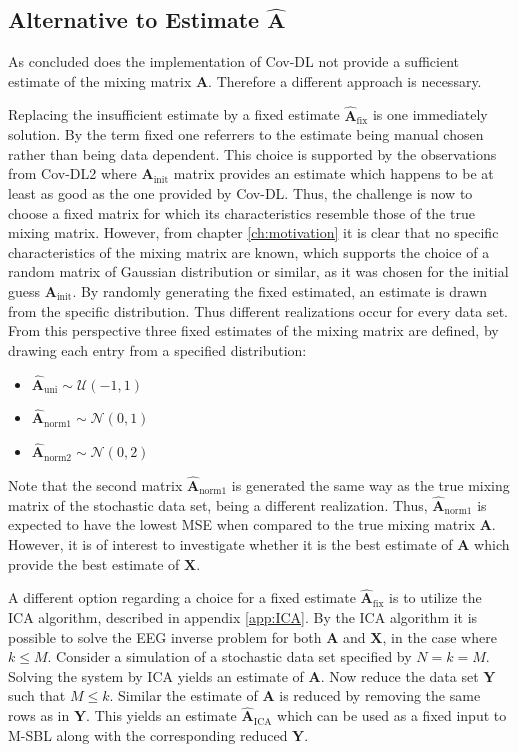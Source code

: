 \subsection{Alternative to Estimate $\hat{\textbf{A}}$}  
As concluded does the implementation of Cov-DL not provide a sufficient estimate of the mixing matrix $\mathbf{A}$. 
Therefore a different approach is necessary. 

Replacing the insufficient estimate by a fixed estimate $\hat{\mathbf{A}}_{\text{fix}}$ is one immediately solution. By the term fixed one referrers to the estimate being manual chosen rather than being data dependent.  
This choice is supported by the observations from Cov-DL2 where $\mathbf{A}_{\text{init}}$ matrix provides an estimate which happens to be at least as good as the one provided by Cov-DL. 
Thus, the challenge is now to choose a fixed matrix for which its characteristics resemble those of the true mixing matrix. 
However, from chapter \ref{ch:motivation} it is clear that no specific characteristics of the mixing matrix are known, which supports the choice of a random matrix of Gaussian distribution or similar, as it was chosen for the initial guess $\mathbf{A}_{\text{init}}$.
By randomly generating the fixed estimated, an estimate is drawn from the specific distribution. Thus different realizations occur for every data set.    
From this perspective three fixed estimates of the mixing matrix are defined, by drawing each entry from a specified distribution: 
\begin{itemize}
\item[] $\hat{\mathbf{A}}_{\text{uni}} \sim \mathcal{U}(-1,1)$
\item[] $\hat{\mathbf{A}}_{\text{norm1}} \sim \mathcal{N}(0,1)$                                           
\item[] $\hat{\mathbf{A}}_{\text{norm2}} \sim \mathcal{N}(0,2)$ 
\end{itemize}
Note that the second matrix $\hat{\mathbf{A}}_{\text{norm1}}$ is generated the same way as the true mixing matrix of the stochastic data set, being a different realization. 
Thus, $\hat{\mathbf{A}}_{\text{norm1}}$ is expected to have the lowest MSE when compared to the true mixing matrix $\mathbf{A}$. 
However, it is of interest to investigate whether it is the best estimate of $\mathbf{A}$ which provide the best estimate of $\mathbf{X}$. 

A different option regarding a choice for a fixed estimate $\hat{\mathbf{A}}_{\text{fix}}$ is to utilize the ICA algorithm, described in appendix \ref{app:ICA}. 
By the ICA algorithm it is possible to solve the EEG inverse problem for both $\mathbf{A}$ and $\mathbf{X}$, in the case where $k \leq M$.
Consider a simulation of a stochastic data set specified by $N = k = M$. 
Solving the system by ICA yields an estimate of $\mathbf{A}$. 
Now reduce the data set $\mathbf{Y}$ such that $M \leq k$. 
Similar the estimate of $\mathbf{A}$ is reduced by removing the same rows as in $\mathbf{Y}$. 
This yields an estimate $\hat{\mathbf{A}}_{\text{ICA}}$ which can be used as a fixed input to M-SBL along with the corresponding reduced $\mathbf{Y}$.

